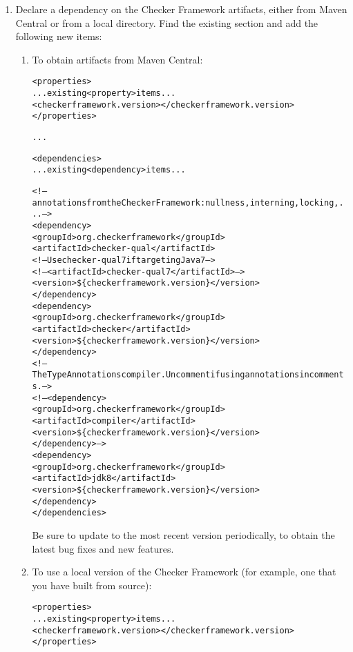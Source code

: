 \begin{enumerate}

\item Declare a dependency on the Checker Framework artifacts, either from
  Maven Central or from a local directory.  Find the
  existing  section and add the following new
   items:

\begin{enumerate}
\item
  To obtain artifacts from Maven Central:

\begin{alltt}
  <properties>
    ... existing <property> items ...
    <checkerframework.version>\ReleaseVersion{}</checkerframework.version>
  </properties>

  ...

  <dependencies>
    ... existing <dependency> items ...

    <!-- annotations from the Checker Framework: nullness, interning, locking, ... -->
    <dependency>
      <groupId>org.checkerframework</groupId>
      <artifactId>checker-qual</artifactId>
       <!-- Use checker-qual7 if targeting Java 7 -->
       <!-- <artifactId>checker-qual7</artifactId> -->
      <version>\$\{checkerframework.version\}</version>
    </dependency>
    <dependency>
      <groupId>org.checkerframework</groupId>
      <artifactId>checker</artifactId>
      <version>\$\{checkerframework.version\}</version>
    </dependency>
    <!-- The Type Annotations compiler. Uncomment if using annotations in comments. -->
    <!-- <dependency>
      <groupId>org.checkerframework</groupId>
      <artifactId>compiler</artifactId>
      <version>\$\{checkerframework.version\}</version>
    </dependency> -->
    <dependency>
      <groupId>org.checkerframework</groupId>
      <artifactId>jdk8</artifactId>
      <version>\$\{checkerframework.version\}</version>
    </dependency>
  </dependencies>
\end{alltt}

Be sure to update to the most recent version periodically, to obtain the
latest bug fixes and new features.

\item
  To use a local version of the Checker Framework (for example,
  one that you have built from source):

\begin{alltt}
  <properties>
    ... existing <property> items ...
    <checkerframework.version>\ReleaseVersion{}</checkerframework.version>
  </properties>


\end{alltt}
\end{enumerate}
\end{enumerate}
